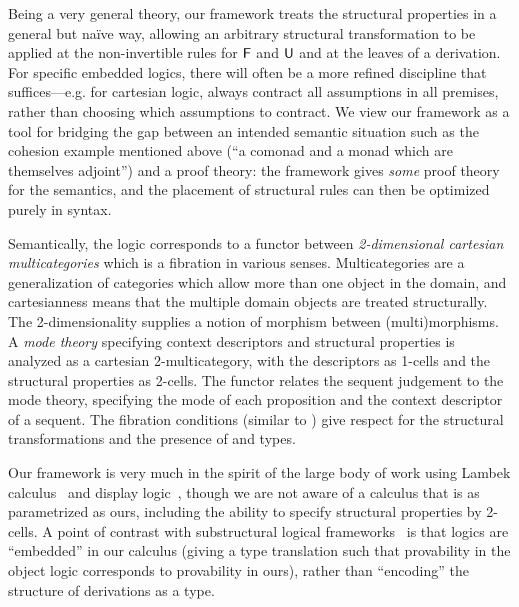 Being a very general theory, our framework treats the structural
properties in a general but na\"ive way, allowing an arbitrary
structural transformation to be applied at the non-invertible rules for
$\mathsf{F}$ and $\mathsf{U}$ and at the leaves of a derivation.  For specific
embedded logics, there will often be a more refined discipline that
suffices---e.g. for cartesian logic, always contract all assumptions
in all premises, rather than choosing which assumptions to contract.  We
view our framework as a tool for bridging the gap between an intended
semantic situation such as the cohesion example mentioned above (``a
comonad and a monad which are themselves adjoint'') and a proof theory:
the framework gives \emph{some} proof theory for the semantics, and the
placement of structural rules can then be optimized purely in syntax.

Semantically, the logic corresponds to a functor between
\emph{2-dimensional cartesian multicategories} which is a fibration in
various senses.  Multicategories are a generalization of categories
which allow more than one object in the domain, and cartesianness means
that the multiple domain objects are treated structurally.  The
2-dimensionality supplies a notion of morphism between (multi)morphisms.
A \emph{mode theory} specifying context descriptors and structural
properties is analyzed as a cartesian 2-multicategory, with the
descriptors as 1-cells and the structural properties as 2-cells.  The
functor relates the sequent judgement to the mode theory, specifying the
mode of each proposition and the context descriptor of a sequent.  The
fibration conditions (similar to
\citep{hermida02fibrations,hormann15multicategories}) give respect for
the structural transformations and the presence of  and 
types.

Our framework is very much in the spirit of the large body of work using
Lambek calculus~\citep{lambek58calculus} and display
logic~\citep{belnap82display}, though we are not aware of a calculus
that is as parametrized as ours, including the ability to specify
structural properties by 2-cells.  A point of contrast with
substructural logical
frameworks~\citep{cervesatopfenning02llf,watkins+03clf-tr,reed09thesis}
is that logics are ``embedded'' in our calculus (giving a type
translation such that provability in the object logic corresponds to
provability in ours), rather than ``encoding'' the structure of
derivations as a type.  


